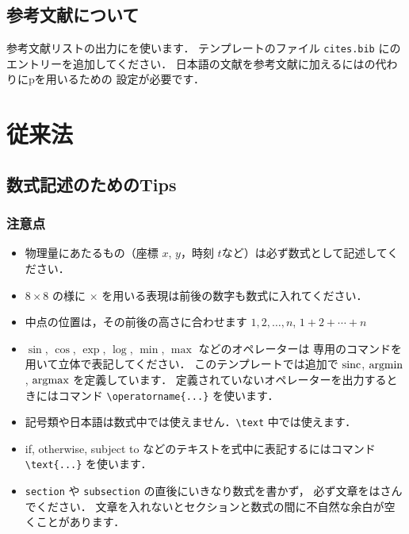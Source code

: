 \documentclass[dvipdfmx,report,disablejfam,nosetpagesize,12pt]{jsbook}
\begin{document}
\section{参考文献について}
参考文献リストの出力に\BibTeX を使います．
テンプレートのファイル \verb+cites.bib+ に\BibTeX のエントリーを追加してください．
日本語の文献を参考文献に加えるには\BibTeX の代わりにp\BibTeX を用いるための
設定が必要です．

\chapter{従来法} \label{Chap.previous}
\section{数式記述のためのTips}

\subsection{注意点}
\begin{itemize}
   \item 物理量にあたるもの（座標 $x$, $y$，時刻 $t$など）は必ず数式として記述してください．
   \item $8\times8$ の様に $\times$ を用いる表現は前後の数字も数式に入れてください．
   \item 中点の位置は，その前後の高さに合わせます %
         $1,2,\ldots,n$,
         $1+2+\cdots+n$
   \item $\sin$, $\cos$, $\exp$, $\log$, $\min$, $\max$ などのオペレーターは
         専用のコマンドを用いて立体で表記してください．
         このテンプレートでは追加で $\operatorname*{sinc}$, $\operatorname*{argmin}$, $\operatorname*{argmax}$ を定義しています．
         定義されていないオペレーターを出力するときにはコマンド \verb+\operatorname{...}+ を使います．
   \item 記号類や日本語は数式中では使えません．\verb+\text+ 中では使えます．
   \item if, otherwise, subject to などのテキストを式中に表記するにはコマンド \verb+\text{...}+ を使います．
   \item \verb+section+ や \verb+subsection+ の直後にいきなり数式を書かず，
         必ず文章をはさんでください．
         文章を入れないとセクションと数式の間に不自然な余白が空くことがあります．
\end{itemize}
\end{document}
